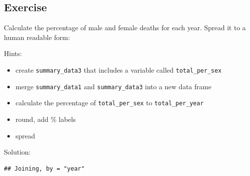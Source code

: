 \documentclass[]{book}
\makeatletter
\newenvironment{Shaded}{\begin{snugshade}}{\end{snugshade}}
\newcommand{\KeywordTok}[1]{\textcolor[rgb]{0.13,0.29,0.53}{\textbf{#1}}}
\newcommand{\DataTypeTok}[1]{\textcolor[rgb]{0.13,0.29,0.53}{#1}}
\newcommand{\StringTok}[1]{\textcolor[rgb]{0.31,0.60,0.02}{#1}}
\newcommand{\OperatorTok}[1]{\textcolor[rgb]{0.81,0.36,0.00}{\textbf{#1}}}
\newcommand{\NormalTok}[1]{#1}
\providecommand{\tightlist}{%
  \setlength{\itemsep}{0pt}\setlength{\parskip}{0pt}}
\newenvironment{kframe}{%
\medskip{}
\setlength{\fboxsep}{.8em}
 \def\at@end@of@kframe{}%
 \ifinner\ifhmode%
  \def\at@end@of@kframe{\end{minipage}}%
  \begin{minipage}{\columnwidth}%
 \fi\fi%
 \def\FrameCommand##1{\hskip\@totalleftmargin \hskip-\fboxsep
 \colorbox{shadecolor}{##1}\hskip-\fboxsep
     \hskip-\linewidth \hskip-\@totalleftmargin \hskip\columnwidth}%
 \MakeFramed {\advance\hsize-\width
   \@totalleftmargin\z@ \linewidth\hsize
   \@setminipage}}%
 {\par\unskip\endMakeFramed%
 \at@end@of@kframe}
\renewenvironment{Shaded}{\begin{kframe}}{\end{kframe}}
\makeatother
\begin{document}
\subsection{Exercise}\label{exercise-19}

Calculate the percentage of male and female deaths for each year. Spread
it to a human readable form:

Hints:

\begin{itemize}
\tightlist
\item
  create \texttt{summary\_data3} that includes a variable called
  \texttt{total\_per\_sex}
\item
  merge \texttt{summary\_data1} and \texttt{summary\_data3} into a new
  data frame
\item
  calculate the percentage of \texttt{total\_per\_sex} to
  \texttt{total\_per\_year}
\item
  round, add \% labels
\item
  spread
\end{itemize}

Solution:

\begin{Shaded}
\end{Shaded}

\begin{verbatim}
## Joining, by = "year"
\end{verbatim}
\end{document}
